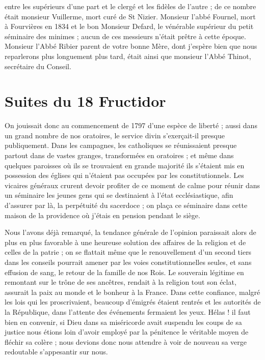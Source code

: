 \documentclass[11pt,a4paper]{report}
\begin{document}
entre les supérieurs d'une part et le clergé et les fidèles de l'autre ; de ce nombre était monsieur Vuillerme, mort curé de St Nizier. Monsieur l'abbé Fournel, mort à Fourvières en 1834 et le bon Monsieur Defard, le vénérable supérieur du petit séminaire des minimes ; aucun de ces messieurs n'était prêtre à cette époque. Monsieur l'Abbé Ribier parent de votre bonne Mère, dont j'espère bien que nous reparlerons plus longuement plus tard, était ainsi que monsieur l'Abbé Thinot, secrétaire du Conseil.

\section*{Suites du 18 Fructidor}

On jouissait donc au commencement de 1797 d'une espèce de liberté ; aussi dans un grand nombre de nos oratoires, le service divin s'exerçait-il presque publiquement. Dans les campagnes, les catholiques se réunissaient presque partout dans de vastes granges, transformées en oratoires ; et même dans quelques paroisses où ils se trouvaient en grande majorité ils s'étaient mis en possession des églises qui n'étaient pas occupées par les constitutionnels. Les vicaires généraux crurent devoir profiter de ce moment de calme pour réunir dans un séminaire les jeunes gens qui se destinaient à l'état ecclésiastique, afin d'assurer par là, la perpétuité du sacerdoce ; on plaça ce séminaire dans cette maison de la providence où j'étais en pension pendant le siège.

Nous l'avons déjà remarqué, la tendance générale de l'opinion paraissait alors de plus en plus favorable à une heureuse solution des affaires de la religion et de celles de la patrie ; on se flattait même que le renouvellement d'un second tiers dans les conseils pourrait amener par les voies constitutionnelles seules, et sans effusion de sang, le retour de la famille de nos Rois. Le souverain légitime en remontant sur le trône de ses ancêtres, rendait à la religion tout son éclat, assurait la paix au monde et le bonheur à la France. Dans cette confiance, malgré les lois qui les proscrivaient, beaucoup d'émigrés étaient rentrés et les autorités de la République, dans l'attente des événements fermaient les yeux. Hélas ! il faut bien en convenir, si Dieu dans sa miséricorde avait suspendu les coups de sa justice nous étions loin d'avoir employé par la pénitence le véritable moyen de fléchir sa colère ; nous devions donc nous attendre à voir de nouveau sa verge redoutable s'appesantir sur nous.
\end{document}
